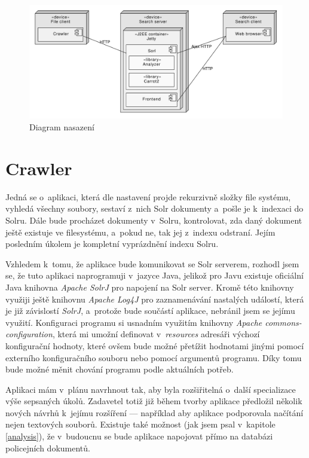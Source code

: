 \begin{figure}[h]
\begin{center}
\includegraphics[width=13cm]{Architecture}
\caption{Diagram nasazení}
\label{fig:Architecture}
\end{center}
\end{figure}

\section{Crawler} \label{design_crawler}
Jedná se o~aplikaci, která dle nastavení projde rekurzivně složky file systému, vyhledá všechny soubory, sestaví z~nich Solr dokumenty a~pošle je k~indexaci do Solru. Dále bude procházet dokumenty v~Solru, kontrolovat, zda daný dokument ještě existuje ve filesystému, a~pokud ne, tak jej z~indexu odstraní. Jejím posledním úkolem je kompletní vyprázdnění indexu Solru.

Vzhledem k~tomu, že aplikace bude komunikovat se Solr serverem, rozhodl jsem se, že tuto aplikaci naprogramuji v~jazyce Java, jelikož pro Javu existuje oficiální Java knihovna \emph{Apache SolrJ} pro napojení na Solr server. Kromě této knihovny využiji ještě knihovnu \emph{Apache Log4J} pro zaznamenávání nastalých událostí, která je již závislostí \emph{SolrJ}, a~protože bude součástí aplikace, nebránil jsem se jejímu využití. Konfiguraci programu si usnadním využitím knihovny \emph{Apache commons-configuration}, která mi umožní definovat v~\emph{resources} adresáři výchozí konfigurační hodnoty, které ovšem bude možné přetížit hodnotami jinými pomocí externího konfiguračního souboru nebo pomocí argumentů programu. Díky tomu bude možné měnit chování programu podle aktuálních potřeb.

Aplikaci mám v~plánu navrhnout tak, aby byla rozšiřitelná o~další specializace výše sepsaných úkolů. Zadavetel totiž již během tvorby aplikace předložil několik nových návrhů k~jejímu rozšíření --- například aby aplikace podporovala načítání nejen textových souborů. Existuje také možnost (jak jsem psal v~kapitole \ref{analysis}), že v~budoucnu se bude aplikace napojovat přímo na databázi policejních dokumentů.

